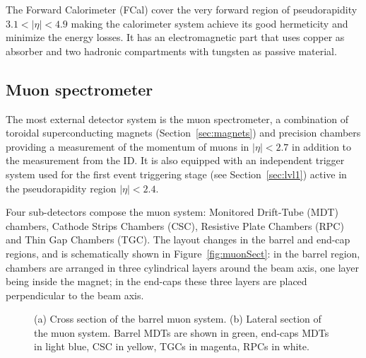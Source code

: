 The Forward Calorimeter (FCal) cover the very forward region of pseudorapidity
$3.1<|\eta|<4.9$ making the calorimeter system achieve its good hermeticity
and minimize the energy losses.
It has an electromagnetic part that uses copper as absorber and two hadronic compartments
with tungsten as passive material. 




\subsection{Muon spectrometer}\label{sec:muonspec}

The most external detector system is the muon spectrometer, a combination
of toroidal superconducting magnets (Section~\ref{sec:magnets}) and precision
chambers providing a measurement of the momentum of muons in $|\eta|<2.7$ in addition
to the measurement from the ID. It is also equipped 
with an independent trigger system used for the first event triggering
stage (see Section~\ref{sec:lvl1}) active in the pseudorapidity region $|\eta|<2.4$. 

Four sub-detectors compose the muon system: Monitored Drift-Tube (MDT) chambers, 
Cathode Strips Chambers (CSC), Resistive Plate Chambers (RPC) and Thin Gap Chambers (TGC).
The layout changes in the barrel and end-cap regions, and is schematically shown in 
Figure~\ref{fig:muonSect}: in the  barrel region, chambers are arranged in three cylindrical layers around
the beam axis, one layer being inside the magnet; in the end-caps these three layers are placed 
perpendicular to the beam axis.

\begin{figure}[tb]\begin{center}
	\caption{(a) Cross section of the barrel muon system. (b) Lateral section of the muon system. 
        Barrel MDTs are shown in green, end-caps MDTs in light blue, CSC in yellow, 
        TGCs in magenta, RPCs in white.%
        }
\end{center}\end{figure}



